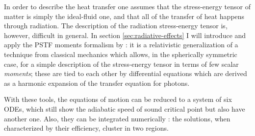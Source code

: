 \documentclass[main.tex]{subfiles}
\begin{document}
In order to describe the heat transfer one assumes that the stress-energy tensor of matter is simply the ideal-fluid one, and that all of the transfer of heat happens through radiation.
The description of the radiation stress-energy tensor is, however, difficult in general.
In section \ref{sec:radiative-effects} I will introduce and apply the PSTF moments formalism by \textcite[]{Thorne:1981feb}: it is a relativistic generalization of a technique from classical mechanics which allows, in the spherically symmetric case, for a simple description of the stress-energy tensor in terms of few scalar \emph{moments}; these are tied to each other by differential equations which are derived as a harmonic expansion of the transfer equation for photons.

With these tools, the equations of motion can be reduced to a system of six ODEs, which still show the adiabatic speed of sound critical point but also have another one.
Also, they can be integrated numerically \cite[]{NobiliTurollaZampieri:1991dec}: the solutions, when characterized by their efficiency, cluster in two regions.
\end{document}
